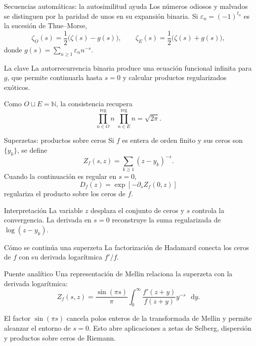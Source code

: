 \documentclass[aspectratio=169,11pt]{beamer}
\newcommand{\reg}{\operatorname{reg}}
\newcommand{\dd}{\mathop{}\!\mathrm{d}}
\begin{document}
\begin{frame}{Secuencias automáticas: la autosimilitud ayuda}
  Los números odiosos y malvados se distinguen por la paridad de unos en su expansión
  binaria. Si $\varepsilon_n=(-1)^{t_n}$ es la sucesión de Thue--Morse,
  \[
    \zeta_O(s)=\frac12\bigl(\zeta(s)-g(s)\bigr),\qquad
    \zeta_E(s)=\frac12\bigl(\zeta(s)+g(s)\bigr),
  \]
  donde $g(s)=\sum_{n\ge1}\varepsilon_n n^{-s}$.
  \pause
  \begin{block}{La clave}
    La autorrecurrencia binaria produce una ecuación funcional infinita para $g$, que
    permite continuarla hasta $s=0$ y calcular productos regularizados exóticos.
  \end{block}
  \pause
  Como $O\sqcup E=\mathbb N$, la consistencia recupera
  \[
    \prod_{n\in O}^{\reg}n\;\prod_{n\in E}^{\reg}n=\sqrt{2\pi}.
  \]
\end{frame}

\begin{frame}[t]{Superzetas: productos sobre ceros}
  \small
  Si $f$ es entera de orden finito y sus ceros son $\{y_k\}$, se define
  \[
    Z_f(s,z)=\sum_{k\ge1}(z-y_k)^{-s}.
  \]
  \pause
  Cuando la continuación es regular en $s=0$,
  \[
    D_f(z)=\exp[-\partial_s Z_f(0,z)]
  \]
  regulariza el producto sobre los ceros de $f$.
  \pause
  \begin{block}{Interpretación}
    La variable $z$ desplaza el conjunto de ceros y $s$ controla la convergencia. La
    derivada en $s=0$ reconstruye la suma regularizada de $\log(z-y_k)$.
  \end{block}
\end{frame}

\begin{frame}[t]{Cómo se continúa una superzeta}
  \small
  La factorización de Hadamard conecta los ceros de $f$ con su derivada logarítmica
  $f'/f$.
  \pause
  \begin{block}{Puente analítico}
    Una representación de Mellin relaciona la superzeta con la derivada logarítmica:
    \[
      Z_f(s,z)=\frac{\sin(\pi s)}{\pi}
      \int_0^\infty\frac{f'(z+y)}{f(z+y)}y^{-s}\,\dd y.
    \]
  \end{block}
  \pause
  El factor $\sin(\pi s)$ cancela polos enteros de la transformada de Mellin y permite
  alcanzar el entorno de $s=0$.
  \pause
  \medskip
  Esto abre aplicaciones a zetas de Selberg, dispersión y productos sobre ceros de
  Riemann.
\end{frame}
\end{document}
